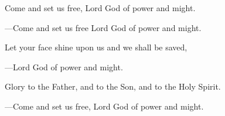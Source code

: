 \responsory

\begin{hangpar}
Come and set us free, Lord God of power and might.

{\color{red}---\thinspace }Come and set us free Lord God of power and might.

\medskip Let your face shine upon us and we shall be saved,

{\color{red}---\thinspace }Lord God of power and might.

\medskip Glory to the Father, and to the Son, and to the Holy Spirit.

{\color{red}---\thinspace }Come and set us free, Lord God of power and might.
\end{hangpar}